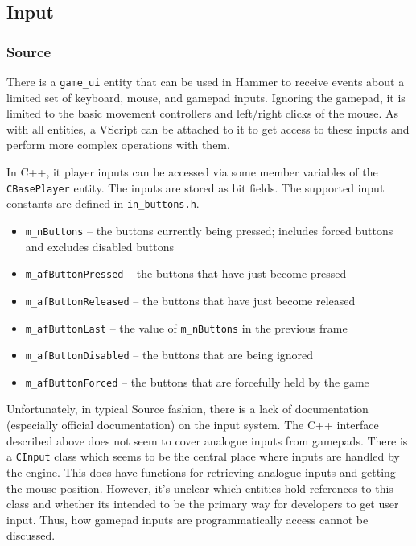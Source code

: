 \documentclass[a4paper, 12pt]{scrartcl}
\begin{document}
\subsection{Input}
\subsubsection{Source}
There is a \texttt{game\_ui} entity that can be used in Hammer to receive events about a limited set of keyboard, mouse, and gamepad inputs. Ignoring the gamepad, it is limited to the basic movement controllers and left/right clicks of the mouse. As with all entities, a VScript can be attached to it to get access to these inputs and perform more complex operations with them.

In C++, it player inputs can be accessed via some member variables of the \texttt{CBasePlayer} entity. The inputs are stored as bit fields. The supported input constants are defined in \href{https://github.com/ValveSoftware/source-sdk-2013/blob/master/mp/src/game/shared/in_buttons.h}{\texttt{in\_buttons.h}}.

\begin{itemize}
  \item \texttt{m\_nButtons} -- the buttons currently being pressed; includes forced buttons and excludes disabled buttons
  \item \texttt{m\_afButtonPressed} -- the buttons that have just become pressed
  \item \texttt{m\_afButtonReleased} -- the buttons that have just become released
  \item \texttt{m\_afButtonLast} -- the value of \texttt{m\_nButtons} in the previous frame
  \item \texttt{m\_afButtonDisabled} -- the buttons that are being ignored
  \item \texttt{m\_afButtonForced} -- the buttons that are forcefully held by the game
\end{itemize}

Unfortunately, in typical Source fashion, there is a lack of documentation (especially official documentation) on the input system. The C++ interface described above does not seem to cover analogue inputs from gamepads. There is a \texttt{CInput} class which seems to be the central place where inputs are handled by the engine. This does have functions for retrieving analogue inputs and getting the mouse position. However, it's unclear which entities hold references to this class and whether its intended to be the primary way for developers to get user input. Thus, how gamepad inputs are programmatically access cannot be discussed.
\end{document}
